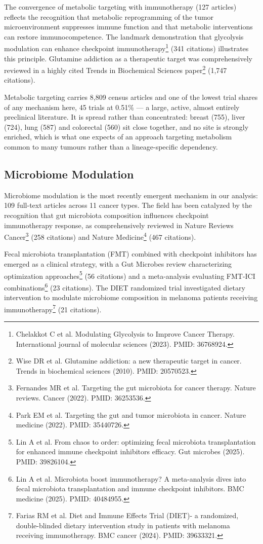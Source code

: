 \documentclass[11pt,twoside,openright]{report}
\begin{document}
The convergence of metabolic targeting with immunotherapy (127 articles) reflects the recognition that metabolic reprogramming of the tumor microenvironment suppresses immune function and that metabolic interventions can restore immunocompetence. The landmark demonstration that glycolysis modulation can enhance checkpoint immunotherapy\footnote{Chelakkot C et al. Modulating Glycolysis to Improve Cancer Therapy. International journal of molecular sciences (2023). PMID: 36768924.} (341 citations) illustrates this principle. Glutamine addiction as a therapeutic target was comprehensively reviewed in a highly cited Trends in Biochemical Sciences paper\footnote{Wise DR et al. Glutamine addiction: a new therapeutic target in cancer. Trends in biochemical sciences (2010). PMID: 20570523.} (1,747 citations).

Metabolic targeting carries 8,809 census articles and one of the lowest trial shares of any mechanism here, 45 trials at 0.51\% --- a large, active, almost entirely preclinical literature. It is spread rather than concentrated: breast (755), liver (724), lung (587) and colorectal (560) sit close together, and no site is strongly enriched, which is what one expects of an approach targeting metabolism common to many tumours rather than a lineage-specific dependency.

\subsection{Microbiome Modulation}

Microbiome modulation is the most recently emergent mechanism in our analysis: 109 full-text articles across 11 cancer types. The field has been catalyzed by the recognition that gut microbiota composition influences checkpoint immunotherapy response, as comprehensively reviewed in Nature Reviews Cancer\footnote{Fernandes MR et al. Targeting the gut microbiota for cancer therapy. Nature reviews. Cancer (2022). PMID: 36253536.} (258 citations) and Nature Medicine\footnote{Park EM et al. Targeting the gut and tumor microbiota in cancer. Nature medicine (2022). PMID: 35440726.} (467 citations).

Fecal microbiota transplantation (FMT) combined with checkpoint inhibitors has emerged as a clinical strategy, with a Gut Microbes review characterizing optimization approaches\footnote{Lin A et al. From chaos to order: optimizing fecal microbiota transplantation for enhanced immune checkpoint inhibitors efficacy. Gut microbes (2025). PMID: 39826104.} (56 citations) and a meta-analysis evaluating FMT-ICI combinations\footnote{Lin A et al. Microbiota boost immunotherapy? A meta-analysis dives into fecal microbiota transplantation and immune checkpoint inhibitors. BMC medicine (2025). PMID: 40484955.} (23 citations). The DIET randomized trial investigated dietary intervention to modulate microbiome composition in melanoma patients receiving immunotherapy\footnote{Farias RM et al. Diet and Immune Effects Trial (DIET)- a randomized, double-blinded dietary intervention study in patients with melanoma receiving immunotherapy. BMC cancer (2024). PMID: 39633321.} (21 citations).
\end{document}
